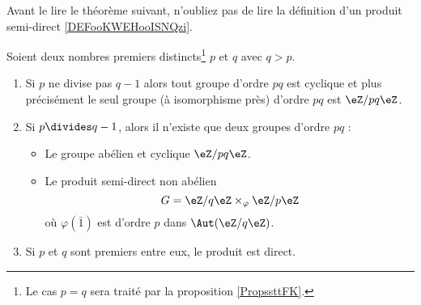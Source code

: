 Avant le lire le théorème suivant, n'oubliez pas de lire la définition d'un produit semi-direct \ref{DEFooKWEHooISNQzi}.
\begin{theorem} \label{ThoLnTMBy}
    Soient deux nombres premiers distincts\footnote{Le cas \( p=q\) sera traité par la proposition \ref{PropssttFK}.} \( p\) et \( q\) avec \( q>p\).
    \begin{enumerate}
        \item
    Si \( p\) ne divise pas \( q-1\) alors tout groupe d'ordre \( pq\) est cyclique et plus précisément le seul groupe (à isomorphisme près) d'ordre \( pq\) est \( \eZ/pq\eZ\).
\item       \label{ITEMooFQXIooFLAiUD}
        Si \( p\divides q-1\), alors il n'existe que deux groupes d'ordre \( pq\) :
        \begin{itemize}
            \item Le groupe abélien et cyclique \( \eZ/pq\eZ\).
            \item Le produit semi-direct non abélien
                \begin{equation}    \label{EqNuuTRE}
                    G=\eZ/q\eZ\times_{\varphi}\eZ/p\eZ
                \end{equation}
                où \( \varphi(\bar 1)\) est d'ordre \( p\) dans \( \Aut(\eZ/q\eZ)\).
        \end{itemize}

    \item

        Si \( p\) et \( q\) sont premiers entre eux, le produit est direct.
    \end{enumerate}
\end{theorem}

